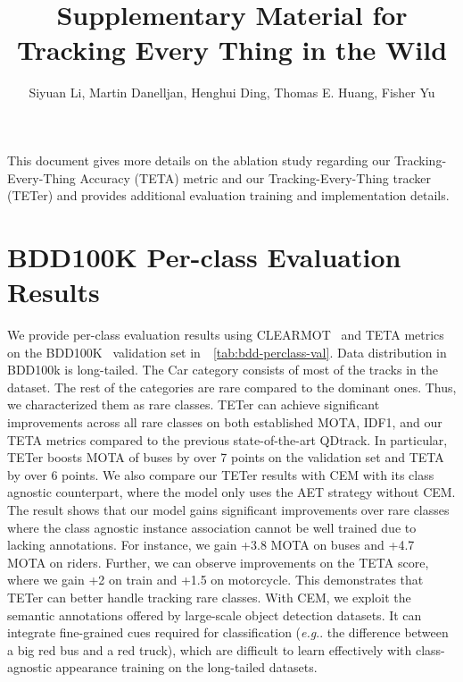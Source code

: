 \documentclass[runningheads]{llncs}
\makeatletter
\DeclareRobustCommand\onedot{\futurelet\@let@token\@onedot}
\def\@onedot{\ifx\@let@token.\else.\null\fi\xspace}
\def\eg{\emph{e.g}\onedot} \def\Eg{\emph{E.g}\onedot}
\makeatother
\begin{document}
\titlespacing*{\section}{0pt}{0.28cm}{0.28cm}
\titlespacing*{\subsection}{0pt}{0.2cm}{0.2cm}


\pagestyle{headings}
\mainmatter




\title{Supplementary Material for Tracking Every Thing in the Wild} 



\author{Siyuan Li, Martin Danelljan, Henghui Ding, Thomas E. Huang, Fisher Yu}

\maketitle

This document gives more details on the ablation study regarding our Tracking-Every-Thing Accuracy (TETA) metric and our Tracking-Every-Thing tracker (TETer) and provides additional evaluation training and implementation details. 

\section{BDD100K Per-class Evaluation Results}

We provide per-class evaluation results using CLEARMOT~\cite{MOTA} and TETA metrics on the BDD100K~\cite{bdd100k} validation set in~\tableautorefname~\ref{tab:bdd-perclass-val}.
Data distribution in BDD100k is long-tailed. The Car category consists of most of the tracks in the dataset. The rest of the categories are rare compared to the dominant ones. Thus, we characterized them as rare classes.
TETer can achieve significant improvements across all rare classes on both established MOTA, IDF1, and our TETA metrics compared to the previous state-of-the-art QDtrack.
In particular, TETer boosts MOTA of buses by over 7 points on the validation set and TETA by over 6 points. 
We also compare our TETer results with CEM with its class agnostic counterpart, where the model only uses the AET strategy without CEM. The result shows that our model gains significant improvements over rare classes where the class agnostic instance association cannot be well trained due to lacking annotations. For instance, we gain +3.8 MOTA on buses and +4.7 MOTA on riders. Further, we can observe improvements on the TETA score, where we gain +2 on train and +1.5 on motorcycle. This demonstrates that TETer can better handle tracking rare classes. With CEM, we exploit the semantic annotations offered by large-scale object detection datasets. It can integrate fine-grained cues required for classification (\eg the difference between a big red bus and a red truck), which are difficult to learn effectively with class-agnostic appearance training on the long-tailed datasets.
\end{document}
